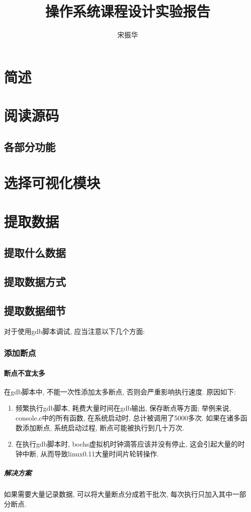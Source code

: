 \documentclass{ctexart}
\title{操作系统课程设计实验报告}
\author{宋振华}
\begin{document}
\maketitle
\section{简述}
\section{阅读源码}
\subsection{各部分功能}
\section{选择可视化模块}
\section{提取数据}
\subsection{提取什么数据}
\subsection{提取数据方式}
\subsection{提取数据细节}
对于使用gdb脚本调试, 应当注意以下几个方面:
\subsubsection{添加断点}
\paragraph{断点不宜太多}在gdb脚本中, 不能一次性添加太多断点, 否则会严重影响执行速度. 原因如下:
\begin{enumerate}
	\item 频繁执行gdb脚本, 耗费大量时间在gdb输出, 保存断点等方面;
	\subitem 举例来说, console.c中的所有函数, 在系统启动时, 总计被调用了5000多次.
	\subitem 如果在诸多函数添加断点, 系统启动过程, 断点可能被执行到几十万次.
	\item 在执行gdb脚本时, bochs虚拟机时钟滴答应该并没有停止, 这会引起大量的时钟中断, 从而导致linux0.11大量时间片轮转操作.
\end{enumerate}
\subparagraph{解决方案}
如果需要大量记录数据, 可以将大量断点分成若干批次, 每次执行只加入其中一部分断点. 
\end{document}
